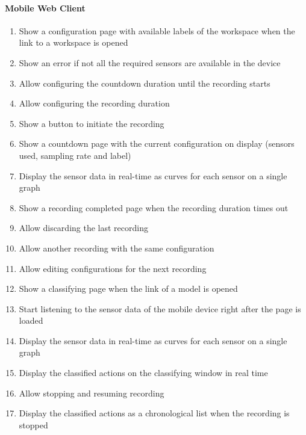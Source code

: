 \paragraph{Mobile Web Client}
\begin{enumerate}[resume*]
    \item Show a configuration page with available labels of the workspace when the link to a workspace is opened
    \item Show an error if not all the required sensors are available in the device
    \item Allow configuring the countdown duration until the recording starts
    \item Allow configuring the recording duration
    \item Show a button to initiate the recording
    \item Show a countdown page with the current configuration on display (sensors used, sampling rate and label)
    \item Display the sensor data in real-time as curves for each sensor on a single graph
    \item Show a recording completed page when the recording duration times out
    \item Allow discarding the last recording
    \item Allow another recording with the same configuration
    \item Allow editing configurations for the next recording
    \item Show a classifying page when the link of a model is opened
    \item Start listening to the sensor data of the mobile device right after the page is loaded
    \item Display the sensor data in real-time as curves for each sensor on a single graph
    \item Display the classified actions on the classifying window in real time
    \item Allow stopping and resuming recording
    \item Display the classified actions as a chronological list when the recording is stopped
\end{enumerate}

